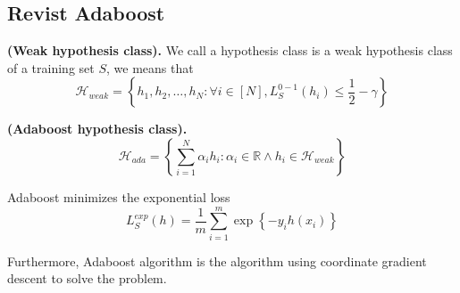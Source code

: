 
\subsection{Revist Adaboost}%
\label{sec:revist_adaboost}

\begin{defn}
    \textbf{(Weak hypothesis class).}
    We call a hypothesis class is a weak hypothesis class of a training set $ S $, we means that
    \begin{equation}
        \mathcal{H}_{weak} = \left\{ 
            h_1, h_2, \ldots, h_N : \forall i \in [N], L^{0-1}_S(h_i) \le \frac{1}{2} - \gamma
        \right\}
    \end{equation}
\end{defn}

\begin{defn}
    \textbf{(Adaboost hypothesis class).}
    \begin{equation}
        \mathcal{H}_{ada} = \left\{ \sum^{N}_{i=1} \alpha_i h_i : \alpha_i \in \mathbb{R} \wedge h_i \in \mathcal{H}_{weak} \right\}
    \end{equation}
\end{defn}

Adaboost minimizes the exponential loss
\[
    L^{e x p}_S(h) = \frac{1}{m} \sum^{m}_{i=1} \exp \left\{ -y_i h(x_i) \right\}
\]

Furthermore, Adaboost algorithm is the algorithm using coordinate gradient descent to solve the problem.

